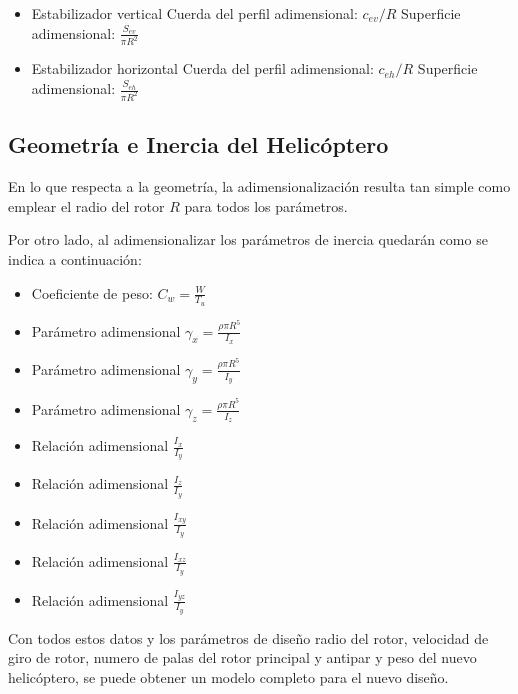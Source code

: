 \singlespacing
\begin{multicols}{2}
	\begin{itemize}
		\item Estabilizador vertical
		\subitem Cuerda del perfil adimensional: $c_{ev}/R$
		\subitem Superficie adimensional: $\frac{S_{ev}}{\pi R^2}$
		\item Estabilizador horizontal
		\subitem Cuerda del perfil adimensional: $c_{eh}/R$
		\subitem Superficie adimensional: $\frac{S_{eh}}{\pi R^2}$
	\end{itemize}
\end{multicols}

\subsection{Geometría e Inercia del Helicóptero}

En lo que respecta a la geometría, la adimensionalización resulta tan simple como emplear el radio del rotor $R$ para todos los parámetros.

Por otro lado, al adimensionalizar los parámetros de inercia quedarán como se indica a continuación:

\singlespacing
\begin{multicols}{2}
	\begin{itemize}
		\item Coeficiente de peso: $C_w=\frac{W}{T_u}$
		\item Parámetro adimensional $\gamma_x=\frac{\rho\pi R^5}{I_x}$
		\item Parámetro adimensional $\gamma_y=\frac{\rho\pi R^5}{I_y}$
		\item Parámetro adimensional $\gamma_z=\frac{\rho\pi R^5}{I_z}$
		\item Relación adimensional $\frac{I_x}{I_y}$
		\item Relación adimensional $\frac{I_z}{I_y}$
		\item Relación adimensional $\frac{I_{xy}}{I_y}$
		\item Relación adimensional $\frac{I_{xz}}{I_y}$
		\item Relación adimensional $\frac{I_{yz}}{I_y}$
	\end{itemize}
\end{multicols}

Con todos estos datos y los parámetros de diseño radio del rotor, velocidad de giro de rotor, numero de palas del rotor principal y antipar y peso del nuevo helicóptero, se puede obtener un modelo completo para el nuevo diseño.

